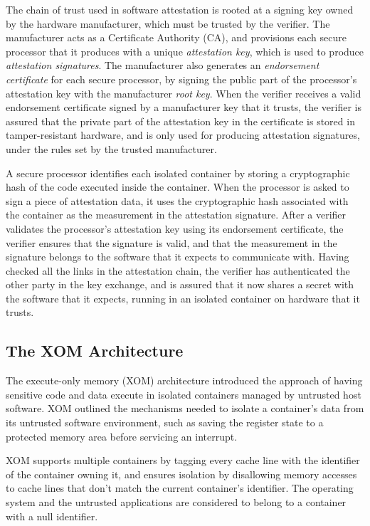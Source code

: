 The chain of trust used in software attestation is rooted at a signing key
owned by the hardware manufacturer, which must be trusted by the verifier. The
manufacturer acts as a Certificate Authority (CA), and provisions each secure
processor that it produces with a unique \textit{attestation key}, which is
used to produce \textit{attestation signatures}. The manufacturer also
generates an \textit{endorsement certificate} for each secure processor,
by signing the public part of the processor's attestation key with the
manufacturer \textit{root key}. When the verifier receives a valid endorsement
certificate signed by a manufacturer key that it trusts, the verifier is
assured that the private part of the attestation key in the certificate is
stored in tamper-resistant hardware, and is only used for producing attestation
signatures, under the rules set by the trusted manufacturer.

A secure processor identifies each isolated container by storing a
cryptographic hash of the code executed inside the container. When the
processor is asked to sign a piece of attestation data, it uses the
cryptographic hash associated with the container as the measurement in the
attestation signature. After a verifier validates the processor's attestation
key using its endorsement certificate, the verifier ensures that the signature
is valid, and that the measurement in the signature belongs to the software
that it expects to communicate with. Having checked all the links in the
attestation chain, the verifier has authenticated the other party in the key
exchange, and is assured that it now shares a secret with the software that it
expects, running in an isolated container on hardware that it trusts.


\subsection{The XOM Architecture}

The execute-only memory (XOM) architecture \cite{lie2000xom} introduced the
approach of having sensitive code and data execute in isolated containers
managed by untrusted host software. XOM outlined the mechanisms needed to
isolate a container's data from its untrusted software environment, such as
saving the register state to a protected memory area before servicing an
interrupt.

XOM supports multiple containers by tagging every cache line with the
identifier of the container owning it, and ensures isolation by disallowing
memory accesses to cache lines that don't match the current container's
identifier. The operating system and the untrusted applications are considered
to belong to a container with a null identifier.

